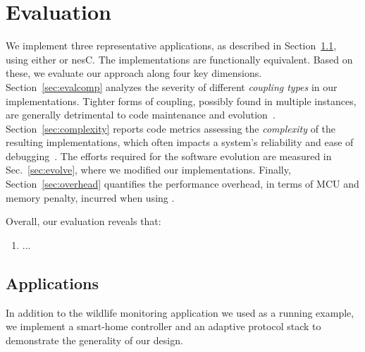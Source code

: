 \section{Evaluation}\label{sec:eval}

We implement three representative applications, as described in
Section~\ref{sec:scenarios}, using either \conesc or nesC. The implementations
are functionally equivalent. Based on these, we evaluate our approach along
four key dimensions. Section~\ref{sec:evalcomp} analyzes the severity of
different \emph{coupling types} in our implementations. Tighter forms of
coupling, possibly found in multiple instances, are generally detrimental to
code maintenance and evolution~\cite{stevens79}. Section~\ref{sec:complexity}
reports code metrics assessing the \emph{complexity} of the resulting
implementations, which often impacts a system's reliability and ease of
debugging~\cite{pressman01}. The efforts required for the software evolution are
measured in Sec.~\ref{sec:evolve}, where we modified our implementations.
Finally, Section~\ref{sec:overhead} quantifies the performance overhead, in
terms of MCU and memory penalty, incurred when using \conesc.

Overall, our evaluation reveals that:
\begin{enumerate}
\item ...
\end{enumerate}


\subsection{Applications}\label{sec:scenarios}

In addition to the wildlife monitoring application we used as a
running example, we implement a smart-home controller and an adaptive
protocol stack to demonstrate the generality of our design.

